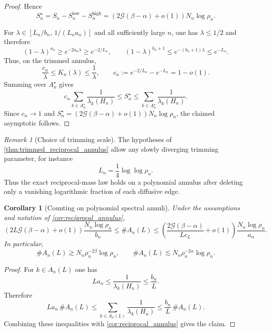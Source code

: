 \documentclass[reqno]{amsart}
\numberwithin{equation}{section}
\newtheorem{corollary}[corollary]{Corollary}
\theoremstyle{definition}
\theoremstyle{remark}
\newtheorem{remark}[remark]{Remark}
\newcommand{\Cref}[1]{\autoref{#1}}
\newcommand{\cG}{\mathcal{G}}
\begin{document}
\begin{proof}
Hence
\[
  S_n^\star
  =
  S_n-S_n^{\mathrm{low}}-S_n^{\mathrm{high}}
  =
  \left(2\cG(\beta-\alpha)+o(1)\right)N_n\log\rho_n.
\]

For $\lambda\in[L_n/b_n,\,1/(L_n a_n)]$ and all sufficiently large $n$, one has $\lambda\le 1/2$ and therefore
\[
  (1-\lambda)^{a_n}\ge e^{-2a_n\lambda}\ge e^{-2/L_n},
  \qquad
  (1-\lambda)^{b_n+1}\le e^{-(b_n+1)\lambda}\le e^{-L_n}.
\]
Thus, on the trimmed annulus,
\[
  \frac{c_n}{\lambda}\le K_n(\lambda)\le \frac{1}{\lambda},
  \qquad
  c_n:=e^{-2/L_n}-e^{-L_n}=1-o(1).
\]
Summing over $A_n^\star$ gives
\[
  c_n\sum_{k\in A_n^\star}\frac{1}{\lambda_k(H_n)}
  \le
  S_n^\star
  \le
  \sum_{k\in A_n^\star}\frac{1}{\lambda_k(H_n)}.
\]
Since $c_n\to1$ and $S_n^\star=\left(2\cG(\beta-\alpha)+o(1)\right)N_n\log\rho_n$, the claimed asymptotic follows.
\end{proof}

\begin{remark}[Choice of trimming scale]
The hypotheses of \Cref{thm:trimmed_reciprocal_annulus} allow any slowly diverging trimming parameter, for instance
\[
  L_n=\frac14\log\log\rho_n.
\]
Thus the exact reciprocal-mass law holds on a polynomial annulus after deleting only a vanishing logarithmic fraction of each diffusive edge.
\end{remark}

\begin{corollary}[Counting on polynomial spectral annuli]\label{cor:annulus_count}
Under the assumptions and notation of \Cref{cor:reciprocal_annulus},
\[
  \left(2L\cG(\beta-\alpha)+o(1)\right)\frac{N_n\log\rho_n}{b_n}
  \le
  \#A_n(L)
  \le
  \left(\frac{2\cG(\beta-\alpha)}{L c_L}+o(1)\right)\frac{N_n\log\rho_n}{a_n}.
\]
In particular,
\[
  \#A_n(L)\gtrsim N_n\rho_n^{-2\beta}\log\rho_n,
  \qquad
  \#A_n(L)\lesssim N_n\rho_n^{-2\alpha}\log\rho_n.
\]
\end{corollary}

\begin{proof}
For $k\in A_n(L)$ one has
\[
  L a_n \le \frac{1}{\lambda_k(H_n)}\le \frac{b_n}{L}.
\]
Therefore
\[
  L a_n\,\#A_n(L)
  \le
  \sum_{k\in A_n(L)}\frac{1}{\lambda_k(H_n)}
  \le
  \frac{b_n}{L}\,\#A_n(L).
\]
Combining these inequalities with \Cref{cor:reciprocal_annulus} gives the claim.
\end{proof}
\end{document}
